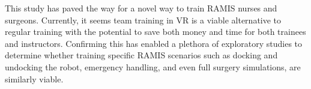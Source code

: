 This study has paved the way for a novel way to train RAMIS nurses and surgeons. Currently, it seems team training in VR is a viable alternative to regular training with the potential to save both money and time for both trainees and instructors. Confirming this has enabled a plethora of exploratory studies to determine whether training specific RAMIS scenarios such as docking and undocking the robot, emergency handling, and even full surgery simulations, are similarly viable.




